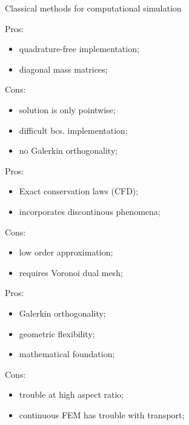\documentclass[aspectratio=169]{beamer}
\begin{document}
\begin{frame}{Classical methods for computational simulation}
\begin{tcbraster}[raster columns=3, raster equal height]
	\begin{tcolorbox}[width=0.32\textwidth, nobeforeafter, colframe=theme,title=Finite differences]%
	Pros:
	\begin{itemize}
		\item quadrature-free implementation;
		\item diagonal mass matrices;
	\end{itemize}
	Cons:
	\begin{itemize}
		\item solution is only pointwise;
		\item difficult bcs. implementation;
		\item no Galerkin orthogonality;
	\end{itemize}
	\end{tcolorbox} 
	\begin{tcolorbox}[width=0.32\textwidth, nobeforeafter,  colframe=theme,title=Finite volumes]%
		Pros:
		\begin{itemize}
			\item Exact conservation laws (CFD);
			\item incorporates discontinous phenomena;
		\end{itemize}
		Cons:
		\begin{itemize}
			\item low order approximation;
			\item requires Voronoi dual mesh;
		\end{itemize}
	\end{tcolorbox}
	\begin{tcolorbox}[width=0.32\textwidth, nobeforeafter,  colframe=theme,title=Finite elements]%
		Pros:
		\begin{itemize}
			\item Galerkin orthogonality;
			\item geometric flexibility;
			\item mathematical foundation;
		\end{itemize}
		Cons:
		\begin{itemize}
			\item trouble at high aspect ratio;
			\item continuous FEM has trouble with transport;
		\end{itemize}
	\end{tcolorbox}
\end{tcbraster}
\end{frame}
\end{document}
